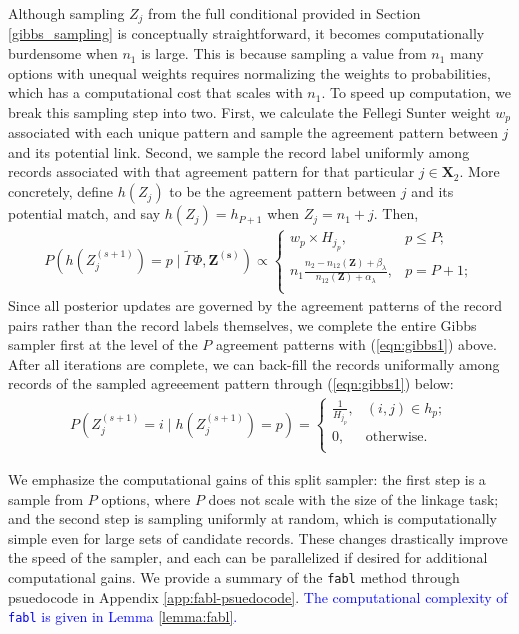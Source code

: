 \documentclass[ba]{imsart}
\begin{document}
Although sampling \(Z_j\) from the full conditional provided in Section \ref{gibbs_sampling} is conceptually straightforward, it becomes computationally burdensome when $n_1$ is large. This is because sampling a value from $n_1$ many options with unequal weights requires normalizing the weights to probabilities, which has a computational cost that scales with $n_1$. To speed up computation, we break this sampling step into two. First, we calculate the Fellegi Sunter weight \(w_{p}\) associated with each unique pattern and sample the agreement pattern between \(j\) and its potential link. Second, we sample the record label uniformly among records associated with that agreement pattern for that particular \(j\in \bm{X}_2\). More concretely, define \(h(Z_j)\) to be the agreement pattern between \(j\) and its potential match, and say \(h(Z_j) = h_{P+1}\) when \(Z_j = n_1 + j\). Then,
	\begin{align}
		\label{eqn:gibbs1}
		P\left(h\left(Z_j^{(s+1)}\right) = p \mid\tilde{\Gamma} \Phi, \bm{Z^{(s)}}\right) \propto
		\begin{cases} 
			w_{p}\times H_{j_p},  & p \leq P; \\
			n_1 \frac{n_2 - n_{12}(\bm{Z}) + \beta_{\lambda}}{n_{12}(\bm{Z}) + \alpha_{\lambda}}, &   p = P + 1; \\
		\end{cases}
	\end{align}
	Since all posterior updates are governed by the agreement patterns of the record pairs rather than the record labels themselves, we complete the entire Gibbs sampler first at the level of the \(P\) agreement patterns with (\ref{eqn:gibbs1}) above. After all iterations are complete, we can back-fill the records uniformally among records of the sampled agreeement pattern through (\ref{eqn:gibbs1}) below:
	\begin{align}
		\label{eqn:gibbs2}
		P\left(Z_j^{(s+1)} = i \mid h\left(Z_j^{(s+1)}\right) = p\right) = \begin{cases} 
			\frac{1}{H_{j_p}}, & (i, j) \in h_p; \\
			0, & \text{otherwise.} \\
		\end{cases}
	\end{align} 
	
	We emphasize the computational gains of this split sampler: the first step is a sample from $P$ options, where $P$ does not scale with the size of the linkage task; and the second step is sampling uniformly at random, which is computationally simple even for large sets of candidate records. These changes drastically improve the speed of the sampler, and each can be parallelized if desired for additional computational gains. We provide a summary of the \texttt{fabl} method through psuedocode in Appendix \ref{app:fabl-psuedocode}. \textcolor{blue}{The computational complexity of \texttt{fabl} is given in Lemma \ref{lemma:fabl}.}
	
\end{document}
